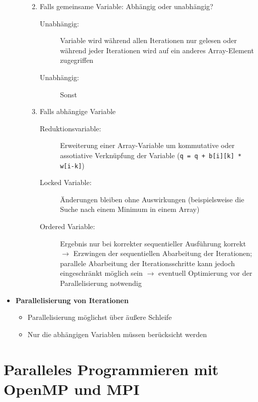 \begin{itemize}
\begin{itemize}
\begin{enumerate}
\begin{description}
			\end{description}
			\item Falls gemeinsame Variable: Abhängig oder unabhängig?
			\begin{description}
				\item[Unabhängig:] Variable wird während allen Iterationen nur gelesen oder während jeder Iterationen wird auf ein anderes Array-Element zugegriffen
				\item[Unabhängig:] Sonst
			\end{description}
			\item Falls abhängige Variable
			\begin{description}
				\item[Reduktionsvariable:] Erweiterung einer Array-Variable um kommutative oder assotiative Verknüpfung der Variable (\texttt{q = q + b[i][k] * w[i-k]})
				\item[Locked Variable:] Änderungen bleiben ohne Auswirkungen (beispielsweise die Suche nach einem Minimum in einem Array)
				\item[Ordered Variable:] Ergebnis nur bei korrekter sequentieller Ausführung korrekt \(\rightarrow\) Erzwingen der sequentiellen Abarbeitung der Iterationen; parallele Abarbeitung der Iterationsschritte kann jedoch eingeschränkt möglich sein \(\rightarrow\) eventuell Optimierung vor der Parallelisierung notwendig
			\end{description}
		\end{enumerate}
	\end{itemize}
	\item \textbf{Parallelisierung von Iterationen}
	\begin{itemize}
		\item Parallelisierung möglichst über äußere Schleife
		\item Nur die abhängigen Variablen müssen berücksicht werden
	\end{itemize}
\end{itemize}



\section{Paralleles Programmieren mit OpenMP und MPI}

